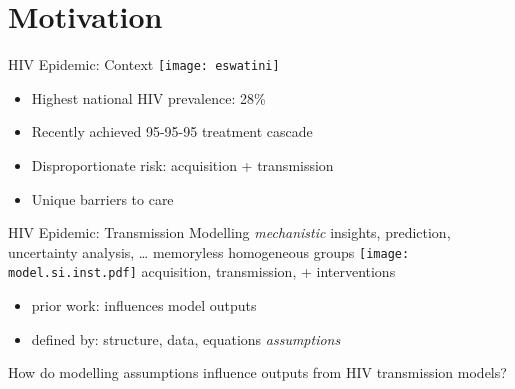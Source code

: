 \section{Motivation}{}
\begin{frame}{HIV Epidemic: Context}
  \texttt{[image: eswatini]}
  \begin{itemize}
    \item Highest national HIV prevalence: 28\%
    \item Recently achieved 95-95-95 treatment cascade
  \end{itemize}
  \begin{itemize}
    \item Disproportionate risk: acquisition + transmission
    \item Unique barriers to care
  \end{itemize}
\end{frame}
\begin{frame}{HIV Epidemic: Transmission Modelling}
   \emph{mechanistic} insights, prediction, uncertainty analysis, \dots
   memoryless homogeneous groups
  \texttt{[image: model.si.inst.pdf]}
   acquisition, transmission, + interventions
  \begin{itemize}
    \item prior work: influences model outputs
    \item defined by: structure, data, equations \rarr \emph{assumptions}
  \end{itemize}
  \pars\rqstyle
  How do modelling assumptions influence outputs from HIV transmission models?
\end{frame}

